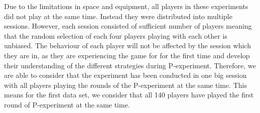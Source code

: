Due to the limitations in space and equipment, all players in these experiments did not play at the same time. Instead they were distributed into multiple sessions. However, each session consisted of sufficient number of players meaning that the random selection of each four players playing with each other is unbiased. The behaviour of each player will not be affected by the session which they are in, as they are experiencing the game for for the first time and develop their understanding of the different strategies during P-experiment. Therefore, we are able to consider that the experiment has been conducted in one big session with all players playing the rounds of the P-experiment at the same time. This means for the first data set, we consider that all 140 players have played the first round of P-experiment at the same time.

